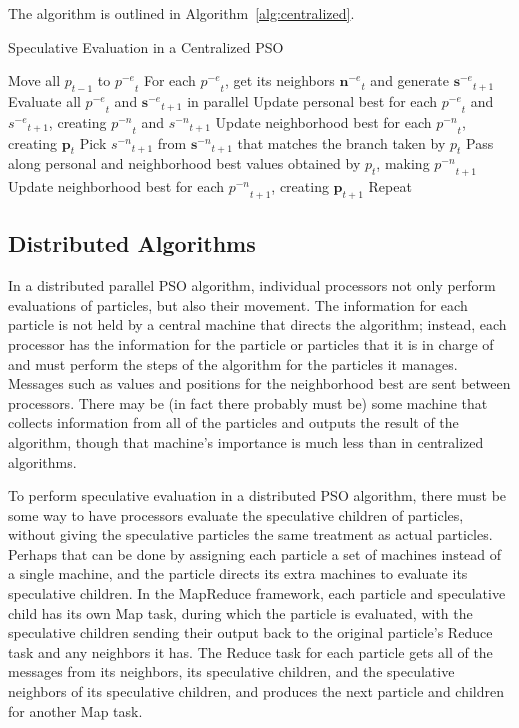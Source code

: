 \documentclass[conference,letterpaper]{IEEEtran}
\newcommand{\alg}[1]{Algorithm~\ref{alg:#1}}
\providecommand{\noeval}[1]{\ensuremath{#1^{-e}}}
\providecommand{\nonbest}[1]{\ensuremath{#1^{-n}}}
\providecommand{\p}{\ensuremath{p}}
\providecommand{\pset}{\ensuremath{\mathbf{p}}}
\providecommand{\s}{\ensuremath{s}}
\providecommand{\sset}{\ensuremath{\mathbf{s}}}
\providecommand{\nset}{\ensuremath{\mathbf{n}}}
\begin{document}
The algorithm is outlined in \alg{centralized}.

\begin{algorithm}
  \caption{Speculative Evaluation in a Centralized PSO}
  \label{alg:centralized}
  \begin{algorithmic}[1]
	\STATE Move all $\p_{t-1}$ to $\noeval{\p}_t$
	\STATE For each $\noeval{\p}_t$, get its neighbors $\noeval{\nset}_t$ and
	  generate $\noeval{\sset}_{t+1}$
	\STATE Evaluate all $\noeval{\p}_t$ and $\noeval{\sset}_{t+1}$ in parallel
	\STATE Update personal best for each $\noeval{\p}_t$ and
	  $\noeval{\s}_{t+1}$, creating $\nonbest{\p}_t$ and $\nonbest{\s}_{t+1}$
	\STATE Update neighborhood best for each $\nonbest{\p}_t$, creating
	  $\pset_t$
	\FORALL{$\p_t$}
	\STATE Pick $\nonbest{\s}_{t+1}$ from $\nonbest{\sset}_{t+1}$ that matches
	  the branch taken by $\p_t$
	\STATE Pass along personal and neighborhood best values obtained by $\p_t$,
	  making $\nonbest{\p}_{t+1}$
	\ENDFOR
	\STATE Update neighborhood best for each $\nonbest{\p}_{t+1}$, creating
	  $\pset_{t+1}$
	\STATE Repeat
  \end{algorithmic}
\end{algorithm}

\subsection{Distributed Algorithms}

In a distributed parallel PSO algorithm, individual processors not only perform
evaluations of particles, but also their movement.  The information for each
particle is not held by a central machine that directs the algorithm; instead,
each processor has the information for the particle or particles that it is in
charge of and must perform the steps of the algorithm for the particles it
manages.  Messages such as values and positions for the neighborhood best are
sent between processors.  There may be (in fact there probably must be) some
machine that collects information from all of the particles and outputs the
result of the algorithm, though that machine's importance is much less than in
centralized algorithms.

To perform speculative evaluation in a distributed PSO algorithm, there must be
some way to have processors evaluate the speculative children of particles,
without giving the speculative particles the same treatment as actual
particles.  Perhaps that can be done by assigning each particle a set of
machines instead of a single machine, and the particle directs its extra
machines to evaluate its speculative children.  In the MapReduce framework,
each particle and speculative child has its own Map task, during which the
particle is evaluated, with the speculative children sending their output back
to the original particle's Reduce task and any neighbors it has.  The Reduce
task for each particle gets all of the messages from its neighbors, its
speculative children, and the speculative neighbors of its speculative
children, and produces the next particle and children for another Map task.
\end{document}
